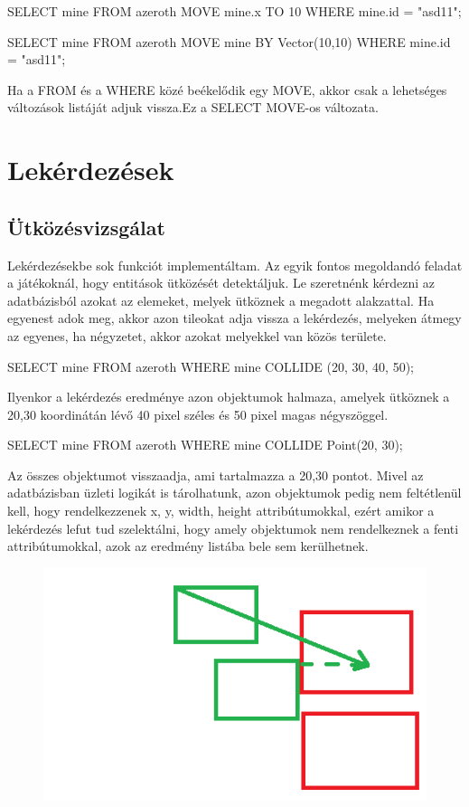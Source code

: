 SELECT mine FROM azeroth MOVE  mine.x TO 10 WHERE mine.id = "asd11"; 

SELECT mine FROM azeroth MOVE  mine BY  Vector(10,10) WHERE mine.id = "asd11";

Ha a FROM és a WHERE közé beékelődik egy MOVE, akkor csak a lehetséges változások listáját adjuk vissza.Ez a SELECT MOVE-os változata.

\section{Lekérdezések}

\subsection{Ütközésvizsgálat}

Lekérdezésekbe sok funkciót implementáltam. Az egyik fontos megoldandó feladat a játékoknál, hogy entitások ütközését detektáljuk. 
Le szeretnénk kérdezni az adatbázisból azokat az elemeket, melyek ütköznek a megadott alakzattal. Ha egyenest adok meg, akkor azon tileokat adja vissza a lekérdezés, melyeken átmegy az egyenes, ha négyzetet, akkor azokat melyekkel van közös területe.

SELECT mine
FROM azeroth
WHERE mine COLLIDE (20, 30, 40, 50);

Ilyenkor a lekérdezés eredménye azon objektumok halmaza, amelyek ütköznek a 20,30 koordinátán lévő 40 pixel széles és 50 pixel magas négyszöggel.

SELECT mine
FROM azeroth
WHERE mine COLLIDE Point(20, 30);

Az összes objektumot visszaadja, ami tartalmazza a 20,30 pontot. 
Mivel az adatbázisban üzleti logikát is tárolhatunk, azon objektumok pedig nem feltétlenül kell, hogy rendelkezzenek x, y, width, height attribútumokkal, ezért amikor a lekérdezés lefut tud szelektálni, hogy amely objektumok nem rendelkeznek a fenti attribútumokkal, azok az eredmény listába bele sem kerülhetnek.

\begin{figure}[htb]
\begin{center}
    \includegraphics[scale=0.5]{images/collision}
    \caption{}
    \label{fig:collision}
\end{center}
\end{figure}


